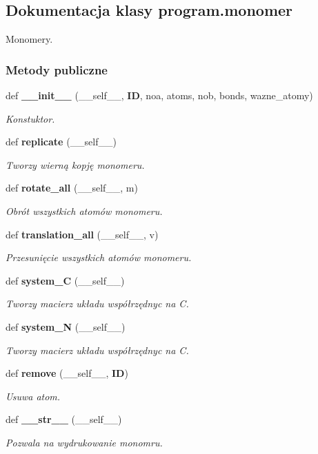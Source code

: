 \subsection{Dokumentacja klasy program.\+monomer}
\label{classprogram_1_1monomer}


Monomery.  


\subsubsection*{Metody publiczne}
\begin{DoxyCompactItemize}
\item 
def \textbf{ \+\_\+\+\_\+init\+\_\+\+\_\+} (\+\_\+\+\_\+self\+\_\+\+\_\+, \textbf{ ID}, noa, atoms, nob, bonds, wazne\+\_\+atomy)
\begin{DoxyCompactList}\small\item\em Konstuktor. \end{DoxyCompactList}\item 
def \textbf{ replicate} (\+\_\+\+\_\+self\+\_\+\+\_\+)
\begin{DoxyCompactList}\small\item\em Tworzy wierną kopję monomeru. \end{DoxyCompactList}\item 
def \textbf{ rotate\+\_\+all} (\+\_\+\+\_\+self\+\_\+\+\_\+, m)
\begin{DoxyCompactList}\small\item\em Obrót wszystkich atomów monomeru. \end{DoxyCompactList}\item 
def \textbf{ translation\+\_\+all} (\+\_\+\+\_\+self\+\_\+\+\_\+, v)
\begin{DoxyCompactList}\small\item\em Przesunięcie wszystkich atomów monomeru. \end{DoxyCompactList}\item 
def \textbf{ system\+\_\+C} (\+\_\+\+\_\+self\+\_\+\+\_\+)
\begin{DoxyCompactList}\small\item\em Tworzy macierz układu współrzędnyc na C. \end{DoxyCompactList}\item 
def \textbf{ system\+\_\+N} (\+\_\+\+\_\+self\+\_\+\+\_\+)
\begin{DoxyCompactList}\small\item\em Tworzy macierz układu współrzędnyc na C. \end{DoxyCompactList}\item 
def \textbf{ remove} (\+\_\+\+\_\+self\+\_\+\+\_\+, \textbf{ ID})
\begin{DoxyCompactList}\small\item\em Usuwa atom. \end{DoxyCompactList}\item 
def \textbf{ \+\_\+\+\_\+str\+\_\+\+\_\+} (\+\_\+\+\_\+self\+\_\+\+\_\+)
\begin{DoxyCompactList}\small\item\em Pozwala na wydrukowanie monomru. \end{DoxyCompactList}\end{DoxyCompactItemize}
